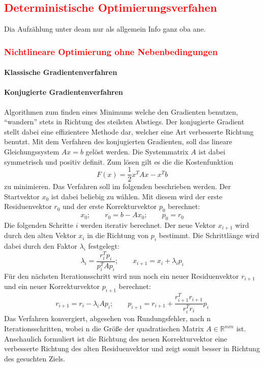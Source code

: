 		\subsection{\textcolor{red}{Deterministische Optimierungsverfahen}}
			Dia Aufzählung unter deam nur als allgemein Info ganz oba ane.	
			\subsubsection{\textcolor{red}{Nichtlineare Optimierung ohne Nebenbedingungen}}
				\paragraph{Klassische Gradientenverfahren}
				\paragraph{Konjugierte Gradientenverfahren}
					Algorithmen zum finden eines Minimums welche den Gradienten benutzen, "`wandern"' stets in Richtung des steilsten Abstiegs. Der konjugierte Gradient stellt dabei eine effizientere Methode dar, welcher eine Art verbesserte Richtung benutzt.
					Mit dem Verfahren des konjugierten Gradienten, soll das lineare Gleichungssystem $A x=b$ gelöst werden. Die Systemmatrix $A$ ist dabei symmetrisch und positiv definit. Zum lösen gilt es die die Kostenfunktion 
					\[ F(x)=\frac{1}{2}x^T A x  - x^T b\]
					zu minimieren.	
					Das Verfahren soll im folgenden beschrieben werden. Der Startvektor $x_0$ ist dabei beliebig zu wählen. Mit diesem wird der erste Residuenvektor $r_0$ und der erste Korrekturvektor $p_0$ berechnet:
					\[ x_0; \qquad r_0=b-A x_0; \qquad p_0=r_0\] 
					Die folgenden Schritte $i$ werden iterativ berechnet. Der neue Vektor $x_{i+1}$ wird durch den alten Vektor $x_i$ in die Richtung von $p_i$ bestimmt. Die Schrittlänge wird dabei durch den Faktor $\lambda_i$ festgelegt:
					\[ \lambda_i=\frac{r_i^T p_i}{p_i^T A p_i}; \qquad x_{i+1}=x_i + \lambda_i p_i\] 
					Für den nächsten Iterationsschritt wird nun noch ein neuer Residuenvektor $r_{i+1}$ und ein neuer Korrekturvektor $p_{i+1}$ berechnet:
					\[ r_{i+1}=r_i - \lambda_i A p_i; \qquad p_{i+1}=r_{i+1}+\frac{r_{i+1}^T r_{i+1}}{r_i^T r_i} p_i\]
					Das Verfahren konvergiert, abgesehen von Rundungsfehler, nach n Iterationsschritten, wobei n die Größe der quadratischen Matrix $A\in \mathbb{R} ^{n x n}$ ist. 
					Anschaulich formuliert ist die Richtung des neuen Korrekturvektor eine verbesserte Richtung des alten Residuenvektor und zeigt somit besser in Richtung des gesuchten Ziels.
